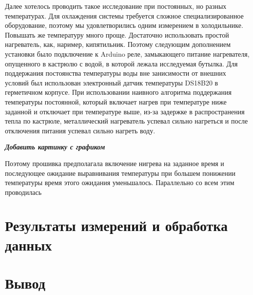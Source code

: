\documentclass[12pt,a4paper]{scrartcl}
\begin{document}
Далее хотелось проводить такое исследование при постоянных, но разных температурах. Для охлаждения системы требуется сложное специализированное оборудование, поэтому мы удовлетворились одним измерением в холодильнике. Повышать же температуру много проще. Достаточно использовать простой нагреватель, как, наример, кипятильник. Поэтому следующим дополнением установки было подключение к Arduino реле, замыкающего питание нагревателя, опущенного в кастрюлю с водой, в которой лежала исследуемая бутылка. Для поддержания постоянства температуры воды вне занисимости от внешних условий был использован электронный датчик температуры DS18B20 в герметичном корпусе. При использовании наивного алгоритма поддержания температуры постоянной, который включает нагрев при температуре ниже заданной и отключает при температуре выше, из-за задержке в распространения тепла по кастрюле, металлический нагреватель успевал сильно нагреться и после отключения питания успевал сильно нагреть воду.

\begin{LARGE}
\textbf{\textit{Добавить картинку с графиком}}
\end{LARGE}

Поэтому прошивка предполагала включение нигрева на заданное время и последующее ожидание выравнивания температуры при большем понижении температуры время этого ожидания уменьшалось. Параллельно со всем этим проводилась 
\section{Результаты измерений и обработка данных}



\section{Вывод}
\end{document}

